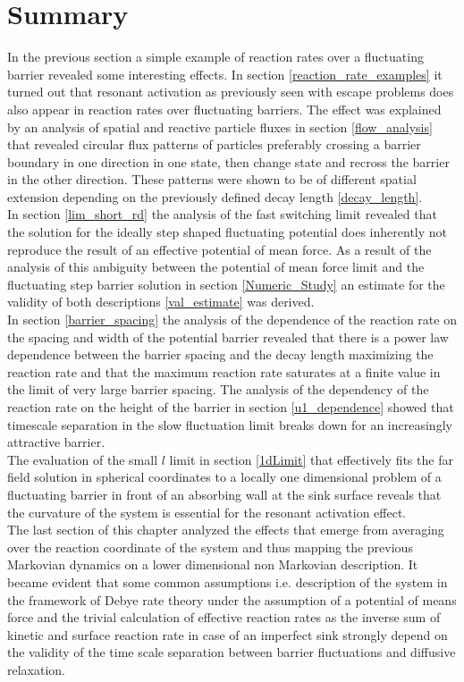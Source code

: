 \section{Summary}
In the previous section a simple example of reaction rates over a fluctuating barrier revealed some interesting effects. In section \ref{reaction_rate_examples} it turned out that resonant activation as previously seen with escape problems does also appear in reaction rates over fluctuating barriers. The effect was explained by an analysis of spatial and reactive particle fluxes in section \ref{flow_analysis} that revealed circular flux patterns of particles preferably crossing a barrier boundary in one direction in one state, then change state and recross the barrier in the other direction. These patterns were shown to be of different spatial extension depending on the previously defined decay length \eqref{decay_length}.  \\
In section \ref{lim_short_rd} the analysis of the fast switching limit revealed that the solution for the ideally step shaped fluctuating potential does inherently not reproduce the result of an effective potential of mean force. As a result of the analysis of this ambiguity between the potential of mean force limit and the fluctuating step barrier solution in section \ref{Numeric_Study} an estimate for the validity of both descriptions \eqref{val_estimate} was derived.\\
In section \ref{barrier_spacing} the analysis of the dependence of the reaction rate on the spacing and width of the potential barrier revealed that there is a power law dependence between the barrier spacing and the decay length maximizing the reaction rate and that the maximum reaction rate saturates at a finite value in the limit of very large barrier spacing. The analysis of the dependency of the reaction rate on the height of the barrier in section \ref{u1_dependence} showed that timescale separation in the slow fluctuation limit breaks down for an increasingly attractive barrier. \\
The evaluation of the small $l$ limit in section \ref{1dLimit} that effectively fits the far field solution in spherical coordinates to a locally one dimensional problem of a fluctuating barrier in front of an absorbing wall at the sink surface reveals that the curvature of the system is essential for the resonant activation effect.\\
The last section of this chapter analyzed the effects that emerge from averaging over the reaction coordinate of the system and thus mapping the previous Markovian dynamics on a lower dimensional non Markovian description. It became evident that some common assumptions i.e. description of the system in the framework of Debye rate theory under the assumption of a potential of means force and the trivial calculation of effective reaction rates as the inverse sum of kinetic and surface reaction rate in case of an imperfect sink strongly depend on the validity of the time scale separation between barrier fluctuations and diffusive relaxation.  

